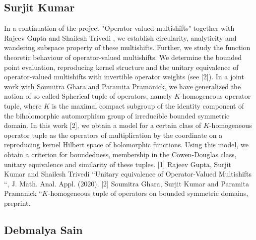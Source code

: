 \subsection{Surjit Kumar}

In a continuation of the project "Operator valued multishifts" together with Rajeev Gupta and Shailesh Trivedi , we establish circularity, analyticity and wandering subspace property of these multishifts. Further, we study the function theoretic behaviour of operator-valued multishifts. We determine the bounded point evaluation, reproducing kernel structure and the unitary equivalence of operator-valued multishifts with invertible operator weights (see [2]).   In a joint work with Soumitra Ghara and Paramita Pramanick, we have generalized the notion of so called Spherical tuple of operators, namely $K$-homogeneous operator tuple, where $K$ is the maximal compact subgroup of the identity component of the biholomorphic automorphism group of irreducible bounded symmetric domain. In this work [2], we obtain a model for a certain class of $K$-homogeneous operator tuple as the operators of multiplication by the coordinate on a reproducing kernel Hilbert space of holomorphic functions. Using this model, we obtain a criterion for boundedness, membership in the Cowen-Douglas class, unitary equivalence and similarity of these tuples.  [1] Rajeev Gupta, Surjit Kumar and Shailesh Trivedi “Unitary equivalence of Operator-Valued Multishifts “, J. Math. Anal. Appl. (2020). [2] Soumitra Ghara, Surjit Kumar and Paramita Pramanick “$K$-homogeneous tuple of operators on bounded symmetric domains, preprint.


\subsection{Debmalya Sain}

